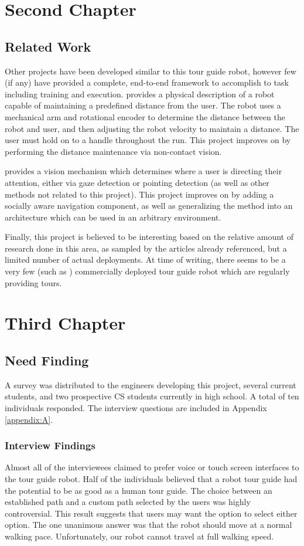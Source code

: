 \documentclass[11pt]{report}
\begin{document}
\chapter{Second Chapter}
\label{chap:two}
\section{Related Work}
Other projects have been developed similar to this tour guide robot, however few (if any) have provided a complete, end-to-end framework to accomplish to task including training and execution. \cite{Cho} provides a physical description of a robot capable of maintaining a predefined distance from the user. The robot uses a mechanical arm and rotational encoder to determine the distance between the robot and user, and then adjusting the robot velocity to maintain a distance. The user must hold on to a handle throughout the run. This project improves on \cite{Cho} by performing the distance maintenance via non-contact vision.

\cite{Aviles} provides a vision mechanism which determines where a user is directing their attention, either via gaze detection or pointing detection (as well as other methods not related to this project). This project improves on \cite{Feil-Seifer} by adding a socially aware navigation component, as well as generalizing the method into an architecture which can be used in an arbitrary environment.

Finally, this project is believed to be interesting based on the relative amount of research done in this area, as sampled by the articles already referenced, but a limited number of actual deployments. At time of writing, there seems to be a very few (such as \cite{Ngo}) commercially deployed tour guide robot which are regularly providing tours.



\chapter{Third Chapter}
\label{chap:three}
\section{Need Finding}
A survey was distributed to the engineers developing this project, several current students, and two prospective CS students currently in high school. A total of ten individuals responded. The interview questions are included in Appendix \ref{appendix:A}.
\subsection{Interview Findings}
Almost all of the interviewees claimed to prefer voice or touch screen interfaces to the tour guide robot. Half of the individuals believed that a robot tour guide had the potential to be as good as a human tour guide. The choice between an established path and a custom path selected by the users was highly controversial. This result suggests that users may want the option to select either option. The one unanimous answer was that the robot should move at a normal walking pace. Unfortunately, our robot cannot travel at full walking speed. 
\end{document}
